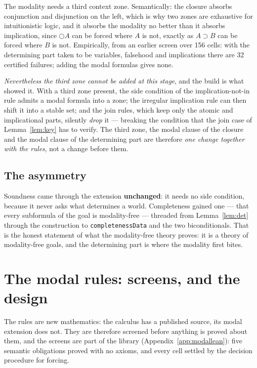 \documentclass[11pt,a4paper]{article}
\begin{document}
\begin{finding}
\label{find:zone}
The modality needs a third context zone. Semantically: the closure absorbs
conjunction and disjunction on the left, which is why two zones are
exhaustive for intuitionistic logic, and it absorbs the modality no
better than it absorbs implication, since $\bigcirc A$ can be forced where
$A$ is not, exactly as $A \supset B$ can be forced where $B$ is not.
Empirically, from an earlier screen over 156 cells: with the determining
part taken to be variables, falsehood and implications there are 32
certified failures; adding the modal formulas gives none.

\emph{Nevertheless the third zone cannot be added at this stage}, and the
build is what showed it. With a third zone present, the side condition of
the implication-not-in rule admits a modal formula into a zone; the
irregular implication rule can then shift it into a stable set; and the
join rules, which keep only the atomic and implicational parts, silently
\emph{drop} it --- breaking the condition that the join case of
Lemma~\ref{lem:key} has to verify. The third zone, the modal clause of the
closure and the modal clause of the determining part are therefore
\emph{one change together with the rules}, not a change before them.
\end{finding}

\subsection{The asymmetry}

Soundness came through the extension \textbf{unchanged}: it needs no side
condition, because it never asks what determines a world. Completeness
gained one --- that every subformula of the goal is modality-free ---
threaded from Lemma~\ref{lem:det} through the construction to
\texttt{completenessData} and the two biconditionals. That is the honest
statement of what the modality-free theory proves: it is a theory of
modality-free goals, and the determining part is where the modality first
bites.

\section{The modal rules: screens, and the design}
\label{sec:rules}

The rules are new mathematics: the calculus has a published source, its
modal extension does not. They are therefore screened before anything is
proved about them, and the screens are part of the library
(Appendix~\ref{app:modallean}): five semantic obligations proved with no
axioms, and every cell settled by the decision procedure for forcing.
\end{document}
